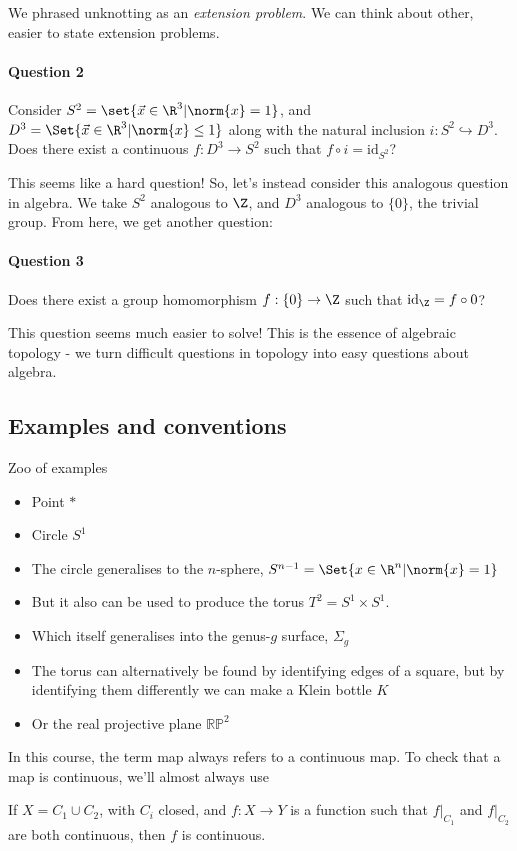 \documentclass{article}
\newcommand{\id}{\mathrm{id}}
\begin{document}
We phrased unknotting as an \emph{extension problem}.  We can think about other, easier to state extension problems.
\paragraph{Question 2}
Consider $S^2 = \set{\vec{x} \in \R^3 | \norm{x} = 1}$, and $D^3 = \Set{\vec{x} \in \R^3 | \norm{x} \leq 1}$ along with the natural inclusion $i: S^2 \hookrightarrow D^3$.
Does there exist a continuous $f: D^3 \to S^2$ such that $f \circ i = \id_{S^2}$?

This seems like a hard question!  So, let's instead consider this analogous question in algebra.
We take $S^2$ analogous to $\Z$, and $D^3$ analogous to $\{0\}$, the trivial group. From here, we get another question:
\paragraph{Question 3} Does there exist a group homomorphism $f: \{0\} \to \Z$ such that $\id_\Z = f \circ 0$?

This question seems much easier to solve! This is the essence of algebraic topology - we turn difficult questions in topology into easy questions about algebra.

\subsection{Examples and conventions}
Zoo of examples

\begin{itemize}
    \item Point $*$
    \item Circle $S^1$
    \item The circle generalises to the $n$-sphere, $S^{n-1} = \Set{x \in \R^n | \norm{x} = 1}$
    \item But it also can be used to produce the torus $T^2 = S^1 \times S^1$.
    \item Which itself generalises into the genus-$g$ surface, $\Sigma_g$
    \item The torus can alternatively be found by identifying edges of a square, but by identifying them differently we can make a Klein bottle $K$
    \item Or the real projective plane $\mathbb{RP}^2$
\end{itemize}

In this course, the term map always refers to a continuous map.
To check that a map is continuous, we'll almost always use
\begin{lemma}
    If $X = C_1 \cup C_2$, with $C_i$ closed, and $f: X \to Y$ is a function such that $f|_{C_1}$ and $f|_{C_2}$ are both continuous, then $f$ is continuous.
\end{lemma}
\end{document}
